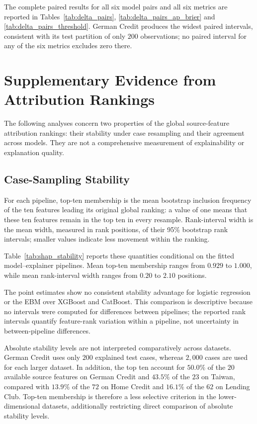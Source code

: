 The complete paired results for all six model pairs and all six metrics are reported in
Tables~\ref{tab:delta_pairs}, \ref{tab:delta_pairs_ap_brier} and
\ref{tab:delta_pairs_threshold}. German Credit produces the widest paired intervals,
consistent with its test partition of only $200$ observations; no paired interval for
any of the six metrics excludes zero there.

\section{Supplementary Evidence from Attribution Rankings}\label{sec:results-explainability}

The following analyses concern two properties of the global source-feature attribution
rankings: their stability under case resampling and their agreement across models. They
are not a comprehensive measurement of explainability or explanation quality.

\subsection{Case-Sampling Stability}\label{sec:results-stability}

For each pipeline, top-ten membership is the mean bootstrap inclusion frequency of the
ten features leading its original global ranking: a value of one means that these ten
features remain in the top ten in every resample. Rank-interval width is the mean width,
measured in rank positions, of their 95\% bootstrap rank intervals; smaller values
indicate less movement within the ranking.

Table~\ref{tab:shap_stability} reports these quantities conditional on the fitted
model--explainer pipelines. Mean top-ten membership ranges from $0.929$ to $1.000$, while
mean rank-interval width ranges from $0.20$ to $2.10$ positions.

The point estimates show no consistent stability advantage for logistic regression or
the EBM over XGBoost and CatBoost. This comparison is descriptive because no intervals
were computed for differences between pipelines; the reported rank intervals quantify
feature-rank variation within a pipeline, not uncertainty in between-pipeline
differences.

Absolute stability levels are not interpreted comparatively across datasets.
German Credit uses only $200$ explained test cases, whereas $2{,}000$ cases are
used for each larger dataset. In addition, the top ten account for $50.0\%$ of
the $20$ available source features on German Credit and $43.5\%$ of the $23$ on
Taiwan, compared with $13.9\%$ of the $72$ on Home Credit and $16.1\%$ of the
$62$ on Lending Club. Top-ten membership is therefore a less selective criterion
in the lower-dimensional datasets, additionally restricting direct comparison of
absolute stability levels.

